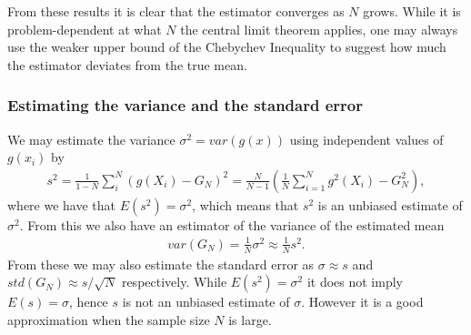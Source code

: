 \documentclass[twoside,english]{uiofysmaster}
\begin{document}
From these results it is clear that the estimator converges as $N$ grows. While it is problem-dependent at what $N$ the central limit theorem applies, one may always use the weaker upper bound of the Chebychev Inequality to suggest how much the estimator deviates from the true mean.


\subsubsection{Estimating the variance and the standard error}
We may estimate the variance $\sigma^2 = var(g(x))$ using independent values of $g(x_i)$ by
\begin{align}
	s^2 = \frac{1}{1-N} \sum_i^N (g(X_i) - G_N)^2 = \frac{N}{N-1} (  \frac{1}{N} \sum_{i=1}^N g^2(X_i) - G_N^2  ),
\end{align}
where we have that $E(s^2) = \sigma^2 $, which means that $s^2$ is an unbiased estimate of $\sigma^2$. From this we also have an estimator of the variance of the estimated mean
\begin{align}
	var(G_N) = \frac{1}{N} \sigma^2 \approx \frac{1}{N} s^2.
\end{align}
From these we may also estimate the standard error as $\sigma \approx s$ and $std(G_N) \approx s/\sqrt{N}$ respectively. While $E(s^2) = \sigma^2$ it does not imply $E(s) = \sigma$, hence $s$ is not an unbiased estimate of $\sigma$. However it is a good approximation when the sample size $N$ is large.


\begin{comment}
\subsubsection{Importance sampling}






Note well that we can do integrations in multiple dimensions with
suprisingly little loss of computational efficiency. That one can work
in many dimensions – indeed one can add extra dimensions – is a
characteristic of Monte Carlo quadrature in contrast to discrete
numerical quadrature, and is a property that can be exploited to great
advantage in many applications.

Finally, pseudorandom numbers might be wanted over truly random numbers for
several reasons where one is dependent on being able to recreate
program runs.
\end{comment}
\end{document}

